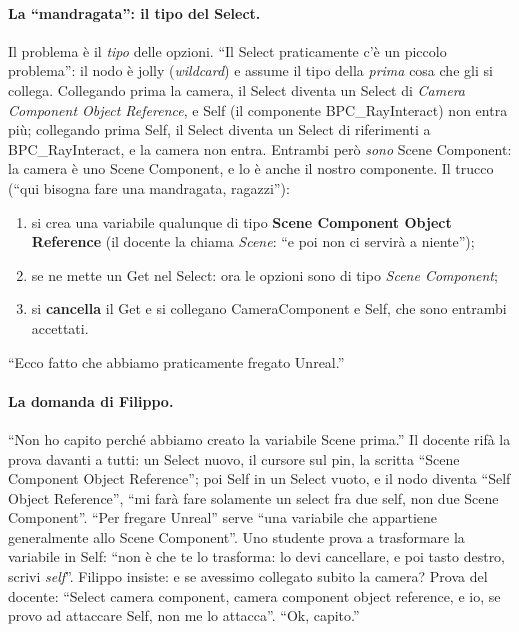 \paragraph{La ``mandragata'': il tipo del Select.} Il problema è il \emph{tipo} delle
opzioni. ``Il Select praticamente c'è un piccolo problema'': il nodo è jolly (\emph{wildcard})
e assume il tipo della \emph{prima} cosa che gli si collega. Collegando prima la camera, il
Select diventa un Select di \emph{Camera Component Object Reference}, e Self (il componente
BPC\_RayInteract) non entra più; collegando prima Self, il Select diventa un Select di
riferimenti a BPC\_RayInteract, e la camera non entra. Entrambi però \emph{sono} Scene
Component: la camera è uno Scene Component, e lo è anche il nostro componente. Il trucco
(``qui bisogna fare una mandragata, ragazzi''):
\begin{enumerate}
  \item si crea una variabile qualunque di tipo \textbf{Scene Component Object Reference}
        (il docente la chiama \emph{Scene}: ``e poi non ci servirà a niente'');
  \item se ne mette un Get nel Select: ora le opzioni sono di tipo \emph{Scene Component};
  \item si \textbf{cancella} il Get e si collegano CameraComponent e Self, che sono entrambi
        accettati.
\end{enumerate}
``Ecco fatto che abbiamo praticamente fregato Unreal.''

\paragraph{La domanda di Filippo.} ``Non ho capito perché abbiamo creato la variabile Scene
prima.'' Il docente rifà la prova davanti a tutti: un Select nuovo, il cursore sul pin, la
scritta ``Scene Component Object Reference''; poi Self in un Select vuoto, e il nodo diventa
``Self Object Reference'', ``mi farà fare solamente un select fra due self, non due Scene
Component''. ``Per fregare Unreal'' serve ``una variabile che appartiene generalmente allo
Scene Component''. Uno studente prova a trasformare la variabile in Self: ``non è che te lo
trasforma: lo devi cancellare, e poi tasto destro, scrivi \emph{self}''. Filippo insiste: e
se avessimo collegato subito la camera? Prova del docente: ``Select camera component, camera
component object reference, e io, se provo ad attaccare Self, non me lo attacca''. ``Ok,
capito.''


